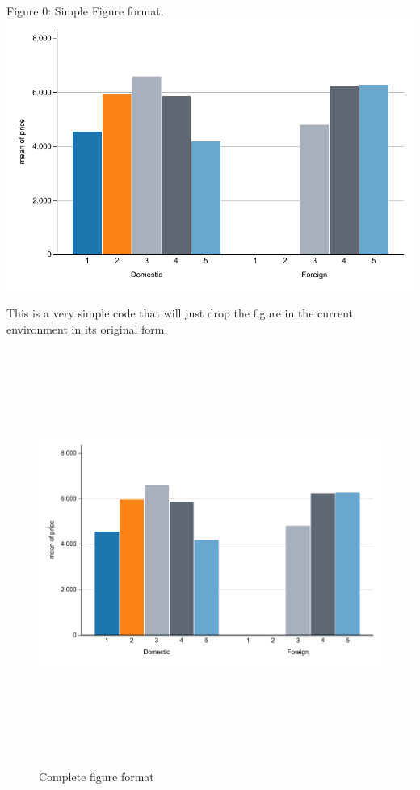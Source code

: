 \documentclass{article}%
\begin{document}


Figure 0: Simple Figure format. \\
\includegraphics{figure1.pdf}

This is a very simple code that will just drop the figure in the current environment in its original form.
\newpage


\begin{figure}[ht]%
        \caption{Complete figure format}%
        \includegraphics[height=5.2287in, width=6.4377in]{figure1.pdf}%
        \label{fig:absolute}%
\end{figure}
\end{document}
